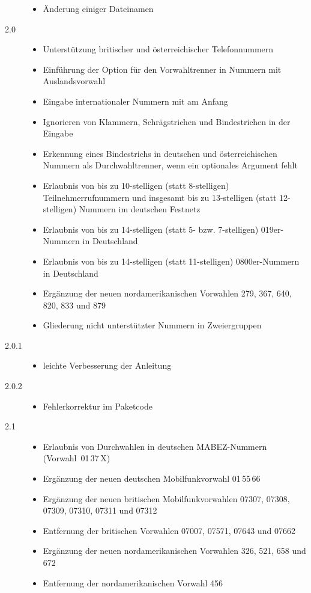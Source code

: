 \documentclass[numbers=noenddot]{scrreprt}
\begin{document}
\begin{description}
\begin{itemize}
\item Änderung einiger Dateinamen
\end{itemize}
\item[2.0] 
\begin{itemize}
\item Unterstützung britischer und österreichischer Telefonnummern
\item Einführung der Option
für den Vorwahltrenner in Nummern mit Auslandsvorwahl
\item Eingabe internationaler Nummern mit
am Anfang
\item Ignorieren von Klammern, Schrägstrichen und Bindestrichen in der Eingabe
\item Erkennung eines Bindestrichs in deutschen und österreichischen Nummern als Durchwahltrenner, wenn ein optionales Argument fehlt
\item Erlaubnis von bis zu 10-stelligen (statt 8-stelligen) Teilnehmerrufnummern und insgesamt bis zu 13-stelligen (statt 12-stelligen) Nummern im deutschen Festnetz
\item Erlaubnis von bis zu 14-stelligen (statt 5- bzw. 7-stelligen) 019er-Nummern in Deutschland
\item Erlaubnis von bis zu 14-stelligen (statt 11-stelligen) 0800er-Nummern in Deutschland
\item Ergänzung der neuen nordamerikanischen Vorwahlen 279, 367, 640, 820, 833 und 879
\item Gliederung nicht unterstützter Nummern in Zweiergruppen
\end{itemize}
\item[2.0.1] 
\begin{itemize}
\item leichte Verbesserung der Anleitung
\end{itemize}
\item[2.0.2] 
\begin{itemize}
\item Fehlerkorrektur im Paketcode
\end{itemize}
\item[2.1] 
\begin{itemize}
\item Erlaubnis von Durchwahlen in deutschen MABEZ-Nummern (Vorwahl~01\,37\,X)
\item Ergänzung der neuen deutschen Mobilfunkvorwahl 01\,55\,66
\item Ergänzung der neuen britischen Mobilfunkvorwahlen 07307, 07308, 07309, 07310, 07311 und 07312
\item Entfernung der britischen Vorwahlen 07007, 07571, 07643 und 07662
\item Ergänzung der neuen nordamerikanischen Vorwahlen 326, 521, 658 und 672
\item Entfernung der nordamerikanischen Vorwahl 456
\end{itemize}
\end{description}
\end{document}
